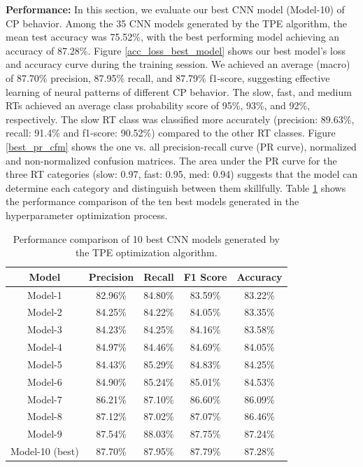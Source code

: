 \documentclass{article}
\begin{document}
\textbf{Performance:} In this section, we evaluate our best CNN model (Model-10) of CP behavior. Among the 35 CNN models generated by the TPE algorithm, the mean test accuracy was 75.52\%, with the best performing model achieving an accuracy of 87.28\%. Figure \ref{acc_loss_best_model} shows our best model's loss and accuracy curve during the training session. We achieved an average (macro) of 87.70\% precision, 87.95\% recall, and 87.79\% f1-score, suggesting effective learning of neural patterns of different CP behavior. The slow, fast, and medium RTs achieved an average class probability score of 95\%, 93\%, and 92\%, respectively. The slow RT class was classified more accurately (precision: 89.63\%, recall: 91.4\% and f1-score: 90.52\%) compared to the other RT classes. Figure \ref{best_pr_cfm} shows the one vs. all precision-recall curve (PR curve), normalized and non-normalized confusion matrices. The area under the PR curve for the three RT categories (slow: 0.97, fast: 0.95, med: 0.94) suggests that the model can determine each category and distinguish between them skillfully. Table \ref{comparison} shows the performance comparison of the ten best models generated in the hyperparameter optimization process.

\begin{table}[h]
        \caption{Performance comparison of 10 best CNN models generated by the TPE optimization algorithm.}
        \vskip 0.15in
        \begin{center}
        \begin{small}
        \begin{sc}
        \begin{tabular}{c | c | c | c | c }
        \textbf{Model} & \textbf{Precision} & \textbf{Recall} & \textbf{F1 Score} & \textbf{Accuracy} \\
        \hline
        Model-1 & 82.96\% & 84.80\% & 83.59\% & 83.22\% \\
        Model-2 & 84.25\% & 84.22\% & 84.05\% & 83.35\% \\
        Model-3 & 84.23\% & 84.25\% & 84.16\% & 83.58\% \\
        Model-4 & 84.97\% & 84.46\% & 84.69\% & 84.05\% \\
        Model-5 & 84.43\% & 85.29\% & 84.83\% & 84.25\% \\
        Model-6 & 84.90\% & 85.24\% & 85.01\% & 84.53\% \\
        Model-7 & 86.21\% & 87.10\% & 86.60\% & 86.09\% \\
        Model-8 & 87.12\% & 87.02\% & 87.07\% & 86.46\% \\
        Model-9 & 87.54\% & 88.03\% & 87.75\% & 87.24\% \\
        Model-10 (best) & 87.70\% & 87.95\% & 87.79\% & 87.28\% \\
       \end{tabular}
     \end{sc}
     \end{small}
     \end{center}
     \vskip -0.1in
     \label{comparison}
   \end{table}
\end{document}
